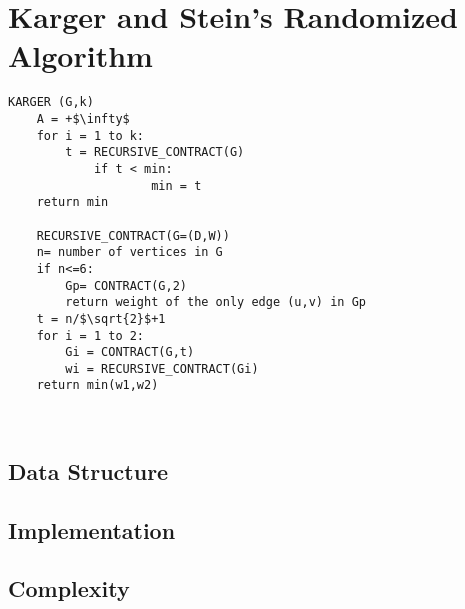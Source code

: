 \section{Karger and Stein's Randomized Algorithm}\label{karger}

\begin{lstlisting}[mathescape=true]
	KARGER (G,k)
	A = +$\infty$
	for i = 1 to k:		
		t = RECURSIVE_CONTRACT(G)		
			if t < min:
					min = t
	return min
	
	RECURSIVE_CONTRACT(G=(D,W))
	n= number of vertices in G
	if n<=6:
		Gp= CONTRACT(G,2)
		return weight of the only edge (u,v) in Gp
	t = n/$\sqrt{2}$+1
	for i = 1 to 2:
		Gi = CONTRACT(G,t)
		wi = RECURSIVE_CONTRACT(Gi)
	return min(w1,w2)
	
	
\end{lstlisting}


\subsection{Data Structure}


\subsection{Implementation}



\subsection{Complexity}



\pagebreak